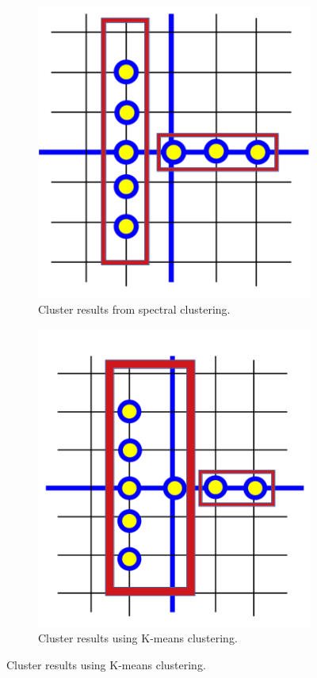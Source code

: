 \documentclass[a4paper]{article}
\begin{document}
\begin{figure}[h]
    \centering
    \begin{subfigure}[b]{0.3\textwidth}
        \includegraphics[width=\textwidth]{Q2_spectral.png}
        \caption{Cluster results from spectral clustering.}
        \label{spectral}
    \end{subfigure}
    \begin{subfigure}[b]{0.3\textwidth}
        \includegraphics[width=\textwidth]{Q2_kmeans.png}
        \caption{Cluster results using K-means clustering.}
        \label{kmeans}
    \end{subfigure}


\end{figure}
\end{document}
